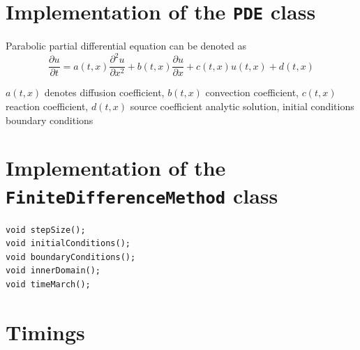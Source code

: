 \documentclass[12pt, oneside]{book}
\theoremstyle{plain}
\theoremstyle{definition}
\begin{document}
\chapter{Implementation of the {\tt PDE} class}
Parabolic partial differential equation can be denoted as
$$ \frac{\partial u}{\partial t} = a(t,x) \frac{\partial^2 u}{\partial x^2} + b(t,x) \frac{\partial u}{\partial x} + c(t,x) u(t,x) + d(t,x) $$

$a(t,x)$ denotes diffusion coefficient,  $b(t,x)$ convection coefficient, $c(t,x)$ reaction coefficient, $d(t,x)$ source coefficient
analytic solution, initial conditions boundary conditions
\chapter{Implementation of the {\tt FiniteDifferenceMethod} class}

\begin{verbatim}
void stepSize();
void initialConditions();
void boundaryConditions();
void innerDomain();
void timeMarch();
\end{verbatim}

\chapter{Timings}




\end{document}
